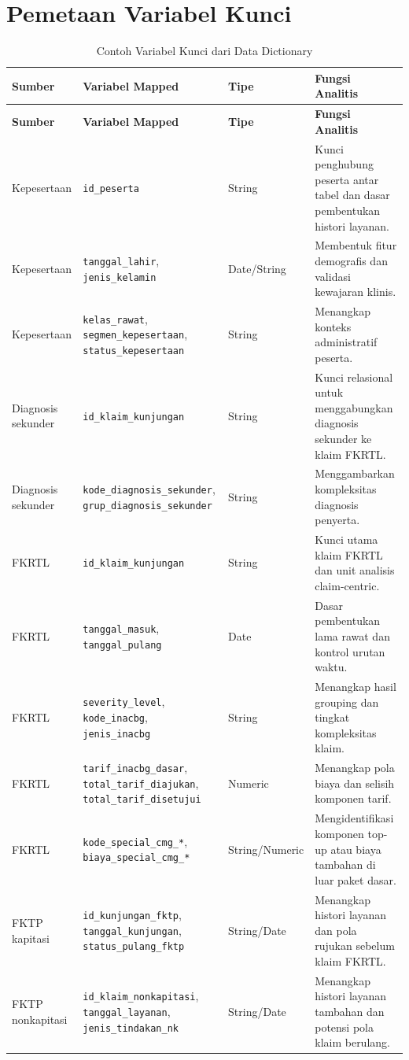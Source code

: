 \section{Pemetaan Variabel Kunci}

\begin{longtable}[]{@{}p{}p{}p{}p{}@{}}
\caption{Contoh Variabel Kunci dari Data Dictionary}\label{tab:lampiran-variabel-kunci}\\
\toprule
\textbf{Sumber} & \textbf{Variabel Mapped} & \textbf{Tipe} & \textbf{Fungsi Analitis} \\
\midrule
\endfirsthead
\toprule
\textbf{Sumber} & \textbf{Variabel Mapped} & \textbf{Tipe} & \textbf{Fungsi Analitis} \\
\midrule
\endhead
\bottomrule
\endfoot
Kepesertaan & \texttt{id\_peserta} & String & Kunci penghubung peserta antar tabel dan dasar pembentukan histori layanan. \\
Kepesertaan & \texttt{tanggal\_lahir}, \texttt{jenis\_kelamin} & Date/String & Membentuk fitur demografis dan validasi kewajaran klinis. \\
Kepesertaan & \texttt{kelas\_rawat}, \texttt{segmen\_kepesertaan}, \texttt{status\_kepesertaan} & String & Menangkap konteks administratif peserta. \\
Diagnosis sekunder & \texttt{id\_klaim\_kunjungan} & String & Kunci relasional untuk menggabungkan diagnosis sekunder ke klaim FKRTL. \\
Diagnosis sekunder & \texttt{kode\_diagnosis\_sekunder}, \texttt{grup\_diagnosis\_sekunder} & String & Menggambarkan kompleksitas diagnosis penyerta. \\
FKRTL & \texttt{id\_klaim\_kunjungan} & String & Kunci utama klaim FKRTL dan unit analisis claim-centric. \\
FKRTL & \texttt{tanggal\_masuk}, \texttt{tanggal\_pulang} & Date & Dasar pembentukan lama rawat dan kontrol urutan waktu. \\
FKRTL & \texttt{severity\_level}, \texttt{kode\_inacbg}, \texttt{jenis\_inacbg} & String & Menangkap hasil grouping dan tingkat kompleksitas klaim. \\
FKRTL & \texttt{tarif\_inacbg\_dasar}, \texttt{total\_tarif\_diajukan}, \texttt{total\_tarif\_disetujui} & Numeric & Menangkap pola biaya dan selisih komponen tarif. \\
FKRTL & \texttt{kode\_special\_cmg\_*}, \texttt{biaya\_special\_cmg\_*} & String/Numeric & Mengidentifikasi komponen top-up atau biaya tambahan di luar paket dasar. \\
FKTP kapitasi & \texttt{id\_kunjungan\_fktp}, \texttt{tanggal\_kunjungan}, \texttt{status\_pulang\_fktp} & String/Date & Menangkap histori layanan dan pola rujukan sebelum klaim FKRTL. \\
FKTP nonkapitasi & \texttt{id\_klaim\_nonkapitasi}, \texttt{tanggal\_layanan}, \texttt{jenis\_tindakan\_nk} & String/Date & Menangkap histori layanan tambahan dan potensi pola klaim berulang. \\
\end{longtable}

